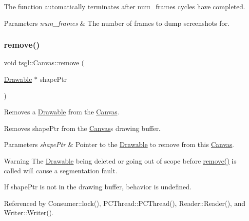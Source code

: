 The function automatically terminates after num\+\_\+frames cycles have completed. 
\begin{DoxyParams}{Parameters}
{\em num\+\_\+frames} & The number of frames to dump screenshots for. \\
\hline
\end{DoxyParams}
\mbox{\label{classtsgl_1_1_canvas_abcd9695030cb5718ebf8973b44180d33}} 
\subsubsection{\texorpdfstring{remove()}{remove()}}
{\footnotesize\ttfamily void tsgl\+::\+Canvas\+::remove (\begin{DoxyParamCaption}\item[{\hyperlink{classtsgl_1_1_drawable}{Drawable} $\ast$}]{shape\+Ptr }\end{DoxyParamCaption})}



Removes a \hyperlink{classtsgl_1_1_drawable}{Drawable} from the \hyperlink{classtsgl_1_1_canvas}{Canvas}. 

Removes shape\+Ptr from the \hyperlink{classtsgl_1_1_canvas}{Canvas}\textquotesingle{}s drawing buffer. 
\begin{DoxyParams}{Parameters}
{\em shape\+Ptr} & Pointer to the \hyperlink{classtsgl_1_1_drawable}{Drawable} to remove from this \hyperlink{classtsgl_1_1_canvas}{Canvas}. \\
\hline
\end{DoxyParams}
\begin{DoxyWarning}{Warning}
The \hyperlink{classtsgl_1_1_drawable}{Drawable} being deleted or going out of scope before \hyperlink{classtsgl_1_1_canvas_abcd9695030cb5718ebf8973b44180d33}{remove()} is called will cause a segmentation fault. 

If shape\+Ptr is not in the drawing buffer, behavior is undefined. 
\end{DoxyWarning}


Referenced by Consumer\+::lock(), P\+C\+Thread\+::\+P\+C\+Thread(), Reader\+::\+Reader(), and Writer\+::\+Writer().

\mbox{\label{classtsgl_1_1_canvas_ada6403439b583910d27e497148da5f2e}} 
